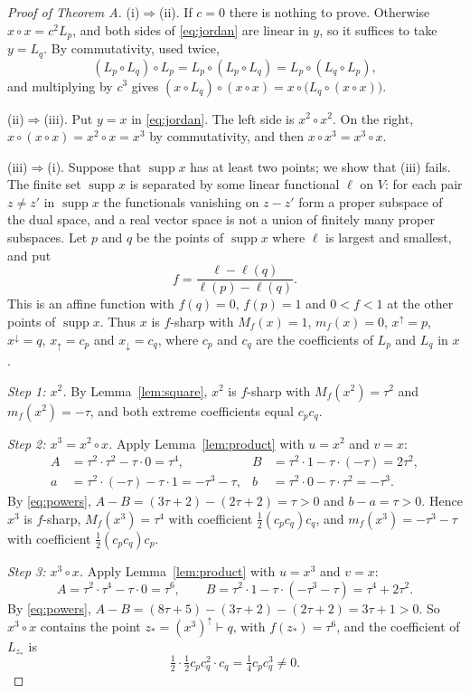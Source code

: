 \documentclass[11pt]{amsart}
\theoremstyle{definition}
\theoremstyle{remark}
\newcommand{\qa}{\vdash}
\newcommand{\supp}{\operatorname{supp}}
\newcommand{\up}{{\uparrow}}
\newcommand{\dn}{{\downarrow}}
\begin{document}
\begin{proof}[Proof of Theorem A]
(i)$\Rightarrow$(ii). If $c=0$ there is nothing to prove. Otherwise $x\circ x=c^2L_p$, and both sides of \eqref{eq:jordan} are linear in $y$, so it suffices to take $y=L_q$. By commutativity, used twice,
\[
(L_p\circ L_q)\circ L_p=L_p\circ(L_p\circ L_q)=L_p\circ(L_q\circ L_p),
\]
and multiplying by $c^3$ gives $(x\circ L_q)\circ(x\circ x)=x\circ\bigl(L_q\circ(x\circ x)\bigr)$.

(ii)$\Rightarrow$(iii). Put $y=x$ in \eqref{eq:jordan}. The left side is $x^2\circ x^2$. On the right, $x\circ(x\circ x)=x^2\circ x=x^3$ by commutativity, and then $x\circ x^3=x^3\circ x$.

(iii)$\Rightarrow$(i). Suppose that $\supp x$ has at least two points; we show that (iii) fails. The finite set $\supp x$ is separated by some linear functional $\ell$ on $V$: for each pair $z\ne z'$ in $\supp x$ the functionals vanishing on $z-z'$ form a proper subspace of the dual space, and a real vector space is not a union of finitely many proper subspaces. Let $p$ and $q$ be the points of $\supp x$ where $\ell$ is largest and smallest, and put
\[
f=\frac{\ell-\ell(q)}{\ell(p)-\ell(q)} .
\]
This is an affine function with $f(q)=0$, $f(p)=1$ and $0<f<1$ at the other points of $\supp x$. Thus $x$ is $f$-sharp with $M_f(x)=1$, $m_f(x)=0$, $x^\up=p$, $x^\dn=q$, $x_\up=c_p$ and $x_\dn=c_q$, where $c_p$ and $c_q$ are the coefficients of $L_p$ and $L_q$ in $x$.

\emph{Step 1: $x^2$.} By Lemma~\ref{lem:square}, $x^2$ is $f$-sharp with $M_f(x^2)=\tau^2$ and $m_f(x^2)=-\tau$, and both extreme coefficients equal $c_pc_q$.

\emph{Step 2: $x^3=x^2\circ x$.} Apply Lemma~\ref{lem:product} with $u=x^2$ and $v=x$:
\begin{align*}
A&=\tau^2\cdot\tau^2-\tau\cdot0=\tau^4, & B&=\tau^2\cdot1-\tau\cdot(-\tau)=2\tau^2,\\
a&=\tau^2\cdot(-\tau)-\tau\cdot1=-\tau^3-\tau, & b&=\tau^2\cdot0-\tau\cdot\tau^2=-\tau^3.
\end{align*}
By \eqref{eq:powers}, $A-B=(3\tau+2)-(2\tau+2)=\tau>0$ and $b-a=\tau>0$. Hence $x^3$ is $f$-sharp, $M_f(x^3)=\tau^4$ with coefficient $\frac12(c_pc_q)c_q$, and $m_f(x^3)=-\tau^3-\tau$ with coefficient $\frac12(c_pc_q)c_p$.

\emph{Step 3: $x^3\circ x$.} Apply Lemma~\ref{lem:product} with $u=x^3$ and $v=x$:
\[
A=\tau^2\cdot\tau^4-\tau\cdot0=\tau^6,\qquad B=\tau^2\cdot1-\tau\cdot(-\tau^3-\tau)=\tau^4+2\tau^2 .
\]
By \eqref{eq:powers}, $A-B=(8\tau+5)-(3\tau+2)-(2\tau+2)=3\tau+1>0$. So $x^3\circ x$ contains the point $z_*=(x^3)^\up\qa q$, with $f(z_*)=\tau^6$, and the coefficient of $L_{z_*}$ is
\[
\tfrac12\cdot\tfrac12c_pc_q^2\cdot c_q=\tfrac14c_pc_q^3\neq0 .
\]


\end{proof}
\end{document}
